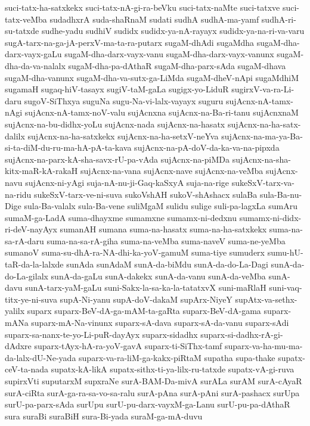 {suci-tatx-ha-satxkekx
suci-tatx-nA-gi-ra-beVku
suci-tatx-naMte
suci-tatxve
suci-tatx-veMba
sudadhxrA
suda-shaRnaM
sudati
sudhA
sudhA-ma-yamf
sudhA-ri-su-tatxde
sudhe-yadu
sudhiV
sudidx
sudidx-ya-nA-rayayx
sudidx-ya-na-ri-va-varu
sugA-tarx-na-ga-jA-perxV-ma-ta-ra-putarx
sugaM-dhAdi
sugaMdha
sugaM-dha-darx-vayx-gaLu
sugaM-dha-darx-vayx-vanu
sugaM-dha-darx-vayx-vanunx
sugaM-dha-da-va-nalalx
sugaM-dha-pa-dAthaR
sugaM-dha-parx-sAda
sugaM-dhava
sugaM-dha-vanunx
sugaM-dha-va-sutx-ga-LiMda
sugaM-dheV-nApi
sugaMdhiM
sugamaH
sugaq-hiV-tasayx
sugiV-taM-gaLa
sugigx-yo-LiduR
sugirxV-va-ra-Li-daru
sugoV-SiThxya
suguNa
sugu-Na-vi-lalx-vayayx
suguru
sujAcnx-nA-tamx-nAgi
sujAcnx-nA-tamx-noV-valu
sujAcnxna
sujAcnx-na-Ba-ri-tanu
sujAcnxnaM
sujAcnx-na-bu-didhx-yoLu
sujAcnx-nada
sujAcnx-na-hasatx
sujAcnx-na-ha-satx-dalilx
sujAcnx-na-ha-satxkekx
sujAcnx-na-ha-setxV-neYva
sujAcnx-na-ma-ya-Ba-si-ta-diM-du-ru-ma-hA-pA-ta-kava
sujAcnx-na-pA-doV-da-ka-va-na-pipxda
sujAcnx-na-parx-kA-sha-savx-rU-pa-vAda
sujAcnx-na-piMDa
sujAcnx-na-sha-kitx-maR-kA-rakaH
sujAcnx-na-vana
sujAcnx-nave
sujAcnx-na-veMba
sujAcnx-navu
sujAcnx-ni-yAgi
suja-nA-nu-ji-Gaq-kaSxyA
suja-na-rige
sukeSxV-tarx-va-na-ridu
sukeSxV-tarx-ve-ni-suva
sukoVshAH
sukoV-shAshacx
sulaBa
sula-Ba-nu-Dige
sula-Ba-valalx
sula-Ba-vene
suliMgaM
sulidu
sulige
suli-pa-lagxLa
sumAru
sumaM-ga-LadA
suma-dhayxme
sumamxne
sumamx-ni-dedxnu
sumamx-ni-didx-ri-deV-nayAyx
sumanAH
sumana
suma-na-hasatx
suma-na-ha-satxkekx
suma-na-sa-rA-daru
suma-na-sa-rA-giha
suma-na-veMba
suma-naveV
suma-ne-yeMba
sumanoV
suma-su-dhA-ra-NA-dhi-ka-yoV-gamuM
suma-tiye
sumuderx
sumu-hU-taR-da-la-lalxde
sunAda
sunAdaM
sunA-da-biMdu
sunA-da-do-La-Dagi
sunA-da-do-La-gilalx
sunA-da-gaLu
sunA-dakekx
sunA-da-vanu
sunA-da-veMba
sunA-davu
sunA-tarx-yaM-gaLu
suni-Sakx-la-sa-ka-la-tatatxvX
suni-maRlaH
suni-vaq-titx-ye-ni-suva
supA-Ni-yanu
supA-doV-dakaM
supArx-NiyeY
supAtx-va-sethx-yalilx
suparx
suparx-BeV-dA-ga-mAM-ta-gaRta
suparx-BeV-dA-gama
suparx-mANa
suparx-mA-Na-vinunx
suparx-sA-dava
suparx-sA-da-vanu
suparx-sAdi
suparx-sa-nanx-te-yo-Li-puR-dayAyx
suparx-sidadhx
suparx-si-dadhx-rA-gi-dAdxre
suparx-tAyx-hA-ra-yoV-gavA
suparx-ti-SiThx-tamf
suparx-va-ha-mu-ma-da-lalx-dU-Ne-yada
suparx-va-ra-liM-ga-kakx-piRtaM
supatha
supa-thake
supatx-ceV-ta-nada
supatx-kA-likA
supatx-sithx-ti-ya-lilx-ru-tatxde
supatx-vA-gi-ruva
supirxVti
suputarxM
supxraNe
surA-BAM-Da-mivA
surALa
surAM
surA-cAyaR
surA-ciRta
surA-ga-ra-sa-vo-sa-ralu
surA-pAna
surA-pAni
surA-pashacx
surUpa
surU-pa-parx-sAda
surUpu
surU-pu-darx-vayxM-ga-Lanu
surU-pu-pa-dAthaR
sura
suraBi
suraBiH
sura-Bi-yada
suraM-ga-mA-duvu
}
